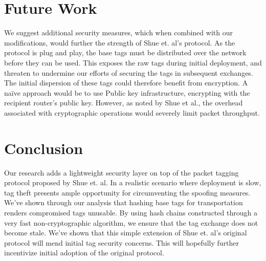 \documentclass[12pt]{article} %
\begin{document}

\newpage %



\section{Future Work}

We suggest additional security measures, which when combined with our modifications, would further the strength of Shue et. al's protocol. As the protocol is plug and play, the base tags must be distributed over the network before they can be used. This exposes the raw tags during initial deployment, and threaten to undermine our efforts of securing the tags in subsequent exchanges. The initial dispersion of these tags could therefore benefit from encryption. A na\"{i}ve approach would be to use Public key infrastructure, encrypting with the recipient router's public key. However, as noted by Shue et al., the overhead associated with cryptographic operations would severely limit packet throughput. 

\section{Conclusion}

Our research adds a lightweight security layer on top of the packet tagging protocol proposed by Shue et. al. In a realistic scenario where deployment is slow, tag theft presents ample opportunity for circumventing the spoofing measures. We've shown through our analysis that hashing base tags for transportation renders compromised tags unusable. By using hash chains constructed through a very fast non-cryptographic algorithm, we ensure that the tag exchange does not become stale. We've shown that this simple extension of Shue et. al's original protocol will mend initial tag security concerns. This will hopefully further incentivize initial adoption of the original protocol. 





%
%

\end{document}
